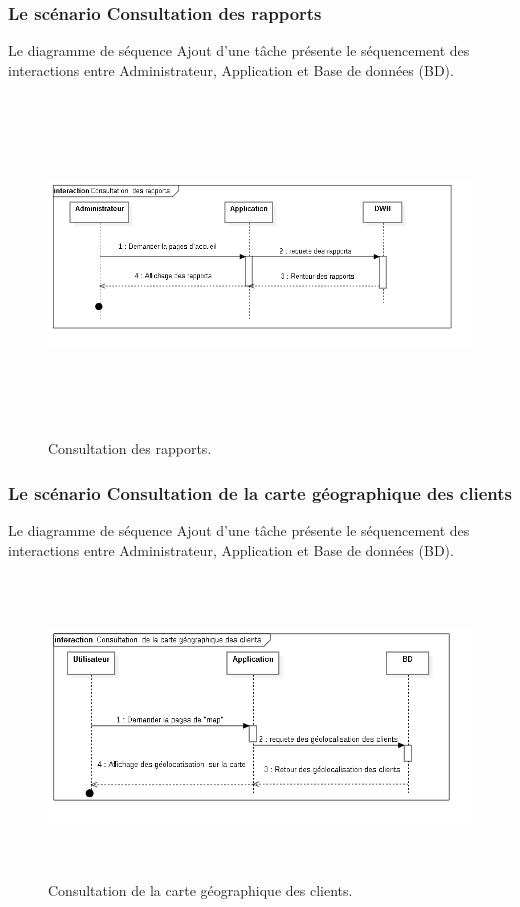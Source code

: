 \newpage
\subsubsection{Le sc\'{e}nario \guillemotleft{} Consultation des rapports\guillemotright{}}
Le diagramme de s\'{e}quence \guillemotleft{} Ajout d'une t\^{a}che \guillemotright{} pr\'{e}sente le s\'{e}quencement
des interactions entre Administrateur, Application et Base de donn\'{e}es (BD).


\begin{figure}[H]
\center
\includegraphics[width=14cm,height=9cm]{./figures/seq/G.png}
\caption{Consultation des rapports.}
\end{figure}


\subsubsection{Le sc\'{e}nario \guillemotleft{} Consultation de la carte g\'{e}ographique des clients\guillemotright{}}
Le diagramme de s\'{e}quence \guillemotleft{} Ajout d'une t\^{a}che \guillemotright{} pr\'{e}sente le s\'{e}quencement
des interactions entre Administrateur, Application et Base de donn\'{e}es (BD).

\begin{figure}[H]
\center
\includegraphics[width=14cm,height=8cm]{./figures/seq/H.png}
\caption{Consultation de la carte g\'{e}ographique des clients.}
\end{figure}
\newpage

